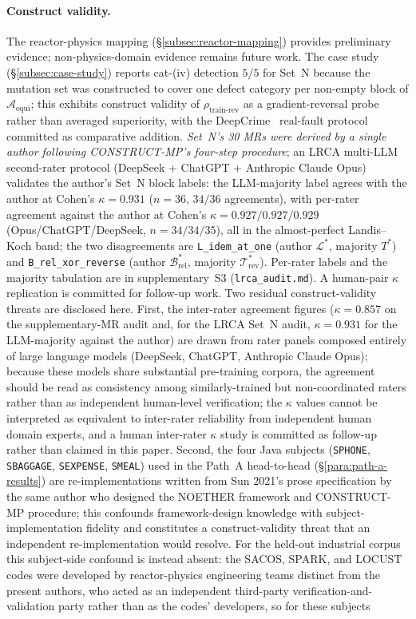 \documentclass[manuscript]{acmart}
\begin{document}
\paragraph{Construct validity.} The reactor-physics mapping (\S\ref{subsec:reactor-mapping}) provides preliminary evidence; non-physics-domain evidence remains future work. The case study (\S\ref{subsec:case-study}) reports cat-(iv) detection $5/5$ for Set~N because the mutation set was constructed to cover one defect category per non-empty block of $\mathcal{A}_{\mathrm{equi}}$; this exhibits construct validity of $\rho_{\mathrm{train\text{-}rev}}$ as a gradient-reversal probe rather than averaged superiority, with the DeepCrime~\cite{Humbatova2021DeepCrime} real-fault protocol committed as comparative addition. \emph{Set~N's 30 MRs were derived by a single author following CONSTRUCT-MP's four-step procedure}; an LRCA multi-LLM second-rater protocol (DeepSeek + ChatGPT + Anthropic Claude Opus) validates the author's Set~N block labels: the LLM-majority label agrees with the author at Cohen's $\kappa = 0.931$ ($n = 36$, $34/36$ agreements), with per-rater agreement against the author at Cohen's $\kappa = 0.927/0.927/0.929$ (Opus/ChatGPT/DeepSeek, $n = 34/34/35$), all in the almost-perfect Landis--Koch band; the two disagreements are \texttt{L\_idem\_at\_one} (author $\mathcal{L}^{*}$, majority $T^{*}$) and \texttt{B\_rel\_xor\_reverse} (author $\mathcal{B}^{*}_{\mathrm{rel}}$, majority $\mathcal{T}^{*}_{\mathrm{rev}}$). Per-rater labels and the majority tabulation are in supplementary~S3 (\texttt{lrca\_audit.md}). A human-pair $\kappa$ replication is committed for follow-up work. Two residual construct-validity threats are disclosed here. First, the inter-rater agreement figures ($\kappa = 0.857$ on the supplementary-MR audit and, for the LRCA Set~N audit, $\kappa = 0.931$ for the LLM-majority against the author) are drawn from rater panels composed entirely of large language models (DeepSeek, ChatGPT, Anthropic Claude Opus); because these models share substantial pre-training corpora, the agreement should be read as consistency among similarly-trained but non-coordinated raters rather than as independent human-level verification; the $\kappa$ values cannot be interpreted as equivalent to inter-rater reliability from independent human domain experts, and a human inter-rater $\kappa$ study is committed as follow-up rather than claimed in this paper. Second, the four Java subjects (\texttt{SPHONE}, \texttt{SBAGGAGE}, \texttt{SEXPENSE}, \texttt{SMEAL}) used in the Path~A head-to-head (\S\ref{para:path-a-results}) are re-implementations written from Sun 2021's prose specification by the same author who designed the NOETHER framework and CONSTRUCT-MP procedure; this confounds framework-design knowledge with subject-implementation fidelity and constitutes a construct-validity threat that an independent re-implementation would resolve. For the held-out industrial corpus this subject-side confound is instead absent: the SACOS, SPARK, and LOCUST codes were developed by reactor-physics engineering teams distinct from the present authors, who acted as an independent third-party verification-and-validation party rather than as the codes' developers, so for these subjects 
\end{document}
